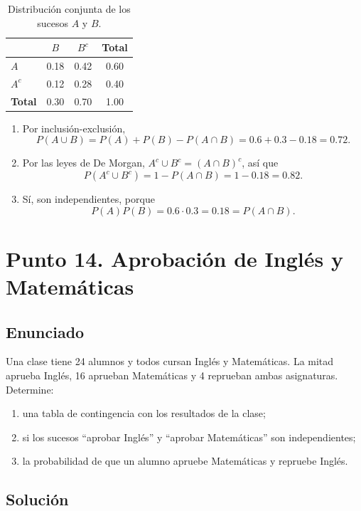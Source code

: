 \documentclass[12pt]{article}
\begin{document}
\begin{table}[H]
\centering
\small
\renewcommand{\arraystretch}{1.15}
\begin{tabular}{|l|c|c|c|}
\hline
 & \textbf{$B$} & \textbf{$B^c$} & \textbf{Total} \\ \hline
\textbf{$A$} & 0.18 & 0.42 & 0.60 \\ \hline
\textbf{$A^c$} & 0.12 & 0.28 & 0.40 \\ \hline
\textbf{Total} & 0.30 & 0.70 & 1.00 \\ \hline
\end{tabular}
\caption{Distribución conjunta de los sucesos $A$ y $B$.}
\label{tab:sucesos-ab}
\end{table}

\begin{enumerate}
    \item Por inclusión-exclusión,
    \[
    P(A\cup B)=P(A)+P(B)-P(A\cap B)=0.6+0.3-0.18=0.72.
    \]
    \item Por las leyes de De Morgan, $A^c\cup B^c=(A\cap B)^c$, así que
    \[
    P(A^c\cup B^c)=1-P(A\cap B)=1-0.18=0.82.
    \]
    \item Sí, son independientes, porque
    \[
    P(A)P(B)=0.6\cdot0.3=0.18=P(A\cap B).
    \]
    \end{enumerate}

\section*{Punto 14. Aprobación de Inglés y Matemáticas}

\subsection*{Enunciado}

Una clase tiene 24 alumnos y todos cursan Inglés y Matemáticas. La mitad aprueba Inglés, 16 aprueban Matemáticas y 4 reprueban ambas asignaturas. Determine:

\begin{enumerate}
    \item una tabla de contingencia con los resultados de la clase;
    \item si los sucesos ``aprobar Inglés'' y ``aprobar Matemáticas'' son independientes;
    \item la probabilidad de que un alumno apruebe Matemáticas y repruebe Inglés.
\end{enumerate}

\subsection*{Solución}
\end{document}
